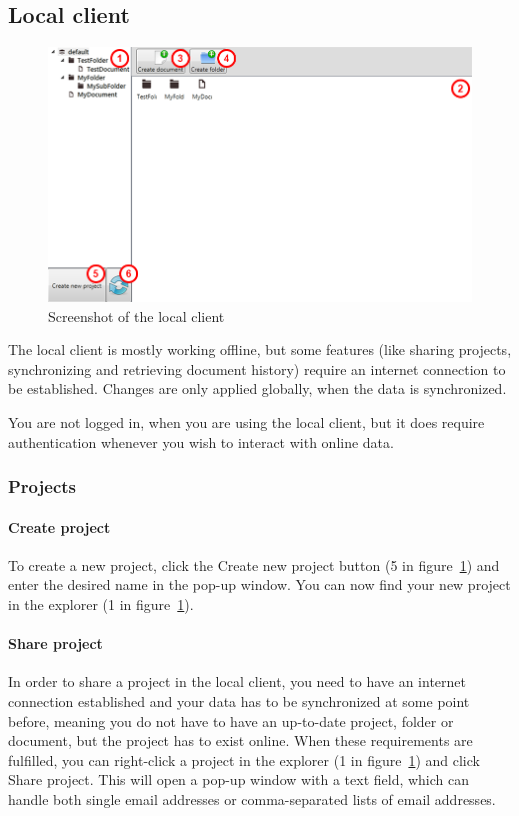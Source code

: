 \subsection{Local client}

\begin{figure}[htb]
	\centering
	\includegraphics[width=1\textwidth]{User_manual/graphics/local.png}
	\caption{Screenshot of the local client}
	\label{fig:manual-local}
\end{figure}

The local client is mostly working offline, but some features (like sharing projects, synchronizing and retrieving document history) require an
internet connection to be established. Changes are only applied globally, when the data is synchronized.

You are not logged in, when you are using the local client, but it does require authentication whenever you wish to interact with online data.

\subsubsection{Projects}

	\paragraph{Create project}
	To create a new project, click the Create new project button (5 in figure~\ref{fig:manual-local}) and enter the desired name in the pop-up window. You can now find your new project in the explorer (1 in figure~\ref{fig:manual-local}).

	\paragraph{Share project}
	In order to share a project in the local client, you need to have an internet connection established and your data
    has to be synchronized at some point before, meaning you do not have to have an up-to-date project, folder or
    document, but the project has to exist online. When these requirements are fulfilled, you can right-click a project
    in the explorer (1 in figure~\ref{fig:manual-local}) and click Share project. This will open a pop-up window with
    a text field, which can handle both single email addresses or comma-separated lists of email addresses.

